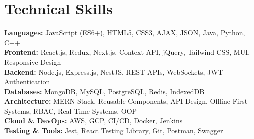 \section{Technical Skills}
\vspace{2pt}

\begin{itemize}[leftmargin=0.15in, label={}]
\small{\item{

\textbf{Languages:} JavaScript (ES6+), HTML5, CSS3, AJAX, JSON, Java, Python, C++ \\[4pt]

\textbf{Frontend:} React.js, Redux, Next.js, Context API, jQuery, Tailwind CSS, MUI, Responsive Design \\[4pt]

\textbf{Backend:} Node.js, Express.js, NestJS, REST APIs, WebSockets, JWT Authentication \\[4pt]

\textbf{Databases:} MongoDB, MySQL, PostgreSQL, Redis, IndexedDB \\[4pt]

\textbf{Architecture:} MERN Stack, Reusable Components, API Design, Offline-First Systems, RBAC, Real-Time Systems, OOP \\[4pt]

\textbf{Cloud \& DevOps:} AWS, GCP, CI/CD, Docker, Jenkins \\[4pt]

\textbf{Testing \& Tools:} Jest, React Testing Library, Git, Postman, Swagger

}}
\end{itemize}
